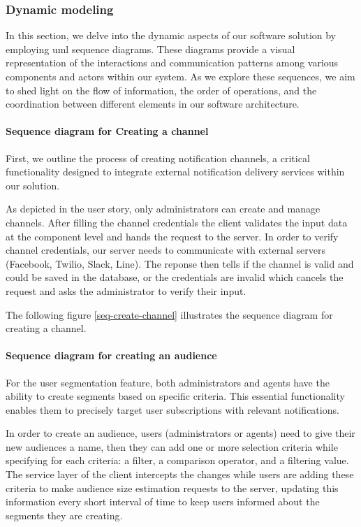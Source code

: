 \subsubsection{Dynamic modeling}
In this section, we delve into the dynamic aspects of our software solution by employing \acrshort{uml}
sequence diagrams. These diagrams provide a visual representation of the interactions and communication
patterns among various components and actors within our system. As we explore these sequences,
we aim to shed light on the flow of information, the order of operations, and the coordination
between different elements in our software architecture.


\paragraph{Sequence diagram for Creating a channel} \mbox{} \newline \newline
First, we outline the process of creating notification channels, a critical functionality
designed to integrate external notification delivery services within our solution.

As depicted in the user story, only administrators can create and manage channels. After filling the channel
credentials the client validates the input data at the component level and hands the request to
the server. In order to verify channel credentials, our server needs to communicate with external servers (Facebook,
Twilio, Slack, Line). The reponse then tells if the channel is valid and could be saved in the database,
or the credentials are invalid which cancels the request and asks the administrator to verify their input.

\noindent The following figure \ref{seq-create-channel} illustrates the sequence diagram for creating a channel.

\paragraph{Sequence diagram for creating an audience} \mbox{} \newline \newline
For the user segmentation feature, both administrators and agents have the ability to create segments
based on specific criteria.  This essential functionality enables them to precisely target user subscriptions
with relevant notifications.

In order to create an audience, users (administrators or agents) need to give their new audiences a name,
then they can add one or more selection criteria while specifying for each criteria: a filter, a comparison operator,
and a filtering value. The service layer of the client intercepts the changes while users are adding these criteria
to make audience size estimation requests to the server, updating this information every short interval of time
to keep users informed about the segments they are creating.

